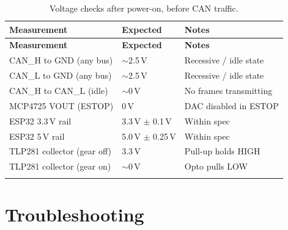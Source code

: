 \documentclass[12pt,a4paper,oneside]{report}
\begin{document}
\begin{center}
\begin{longtable}{p{55mm} p{35mm} p{50mm}}
\toprule
\textbf{Measurement} & \textbf{Expected} & \textbf{Notes} \\
\midrule
\endfirsthead
\toprule
\textbf{Measurement} & \textbf{Expected} & \textbf{Notes} \\
\midrule
\endhead
CAN\_H to GND (any bus)      & $\sim$2.5\,V & Recessive / idle state \\
CAN\_L to GND (any bus)      & $\sim$2.5\,V & Recessive / idle state \\
CAN\_H to CAN\_L (idle)      & $\sim$0\,V   & No frames transmitting \\
MCP4725 VOUT (ESTOP)         & 0\,V         & DAC disabled in ESTOP \\
ESP32 3.3\,V rail            & 3.3\,V $\pm$ 0.1\,V & Within spec \\
ESP32 5\,V rail              & 5.0\,V $\pm$ 0.25\,V & Within spec \\
TLP281 collector (gear off)  & 3.3\,V       & Pull-up holds HIGH \\
TLP281 collector (gear on)   & $\sim$0\,V   & Opto pulls LOW \\
\bottomrule
\caption{Voltage checks after power-on, before CAN traffic.}
\end{longtable}
\end{center}


\chapter{Troubleshooting}
\end{document}

